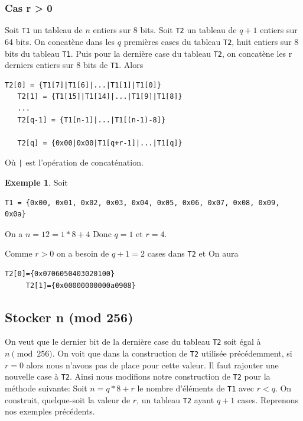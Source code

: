 \documentclass[11pt]{article}
\theoremstyle{definition}
\theoremstyle{definition}
\theoremstyle{definition}
\newtheorem*{myex}{Exemple}
\theoremstyle{theorem}
\theoremstyle{definition}
\begin{document}
\subsubsection{Cas r > 0}
Soit \texttt{T1} un tableau de $n$ entiers sur 8 bits.
Soit \texttt{T2} un tableau de $q+1$ entiers sur 64 bits.
On concatène dans les $q$ premières cases du tableau \texttt{T2}, huit entiers sur 8 bits du tableau \texttt{T1}. Puis pour la dernière case du tableau \texttt{T2}, on concatène les r derniers entiers sur 8 bits de \texttt{T1}. Alors
\begin{lstlisting}[basicstyle={\scriptsize\ttfamily}, columns={fixed}, frame={}]
   T2[0] = {T1[7]|T1[6]|...|T1[1]|T1[0]}
   T2[1] = {T1[15]|T1[14]|...|T1[9]|T1[8]}
   ...
   T2[q-1] = {T1[n-1]|...|T1[(n-1)-8]} 
 
   T2[q] = {0x00|0x00|T1[q+r-1]|...|T1[q]}
\end{lstlisting}
Où \texttt{|} est l'opération de concaténation.
\begin{myex}
  Soit
  \begin{lstlisting}[basicstyle={\scriptsize\ttfamily}, columns={fixed}, frame={}]
    T1 = {0x00, 0x01, 0x02, 0x03, 0x04, 0x05, 0x06, 0x07, 0x08, 0x09, 0x0a}
  \end{lstlisting}
   On a $n = 12 = 1*8 +4$
   Donc $q = 1$ et  $r = 4$.
   
   Comme $r > 0$ on a besoin de $q+1 = 2$ cases dans \texttt{T2} et 
   On aura
   \begin{lstlisting}[basicstyle={\scriptsize\ttfamily}, columns={fixed}, frame={}]
     T2[0]={0x0706050403020100}
     T2[1]={0x00000000000a0908}
   \end{lstlisting}
\end{myex}
\subsection{Stocker n (mod 256)}
On veut que le dernier bit de la dernière case du tableau \texttt{T2} soit égal à $n \pmod {256}$.
On voit que dans la construction de \texttt{T2} utilisée précédemment, si $r = 0$ alors nous n'avons pas 
de place pour cette valeur. Il faut rajouter une nouvelle case à \texttt{T2}.
Ainsi nous modifions notre construction de \texttt{T2} pour la méthode suivante:
Soit $n = q*8 + r$ le nombre d'éléments de \texttt{T1} avec $r<q$.
On construit, quelque-soit la valeur de $r$, un tableau \texttt{T2} ayant $q+1$ cases.
Reprenons nos exemples précédents.
\end{document}
